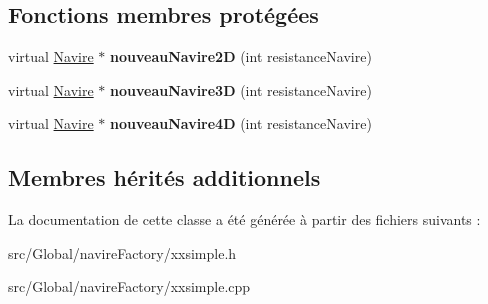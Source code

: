 \subsection*{Fonctions membres protégées}
\begin{DoxyCompactItemize}
\item 
virtual \hyperlink{class_navire}{Navire} $\ast$ {\bfseries nouveau\+Navire2D} (int resistance\+Navire)\hypertarget{class_x_x_simple_a90384cefda9908efbef4b341487f6316}{}\label{class_x_x_simple_a90384cefda9908efbef4b341487f6316}

\item 
virtual \hyperlink{class_navire}{Navire} $\ast$ {\bfseries nouveau\+Navire3D} (int resistance\+Navire)\hypertarget{class_x_x_simple_abf2ff4c7006d93181a9dc543a76f337c}{}\label{class_x_x_simple_abf2ff4c7006d93181a9dc543a76f337c}

\item 
virtual \hyperlink{class_navire}{Navire} $\ast$ {\bfseries nouveau\+Navire4D} (int resistance\+Navire)\hypertarget{class_x_x_simple_a3d558cbbbfaa22f8ba904d2d7f7cbfd9}{}\label{class_x_x_simple_a3d558cbbbfaa22f8ba904d2d7f7cbfd9}

\end{DoxyCompactItemize}
\subsection*{Membres hérités additionnels}


La documentation de cette classe a été générée à partir des fichiers suivants \+:\begin{DoxyCompactItemize}
\item 
src/\+Global/navire\+Factory/xxsimple.\+h\item 
src/\+Global/navire\+Factory/xxsimple.\+cpp\end{DoxyCompactItemize}
